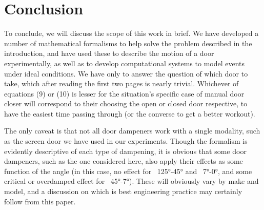 \section{Conclusion} \label{sec:Conclusion}
To conclude, we will discuss the scope of this work in brief. We have developed a number of mathematical formalisms to help solve the problem described in the introduction, and have used these to describe the motion of a door experimentally, as well as to develop computational systems to model events under ideal conditions. We have only to answer the question of which door to take, which after reading the first two pages is nearly trivial.  Whichever of equations (9) or (10) is lesser for the situation's specific case of manual door closer will correspond to their choosing the open or closed door respective, to have the easiest time passing through (or the converse to get a better workout).\par
The only caveat is that not all door dampeners work with a single modality, such as the screen door we have used in our experiments. Though the formalism is evidently descriptive of each type of dampening, it is obvious that some door dampeners, such as the one considered here, also apply their effects as some function of the angle (in this case, no effect for ~125°-45° and ~7°-0°, and some critical or overdamped effect for ~45°-7°). These will obviously vary by make and model, and a discussion on which is best engineering practice may certainly follow from this paper.